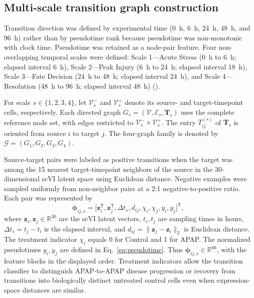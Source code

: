 \subsection*{Multi-scale transition graph construction}

Transition direction was defined by experimental time (0~h, 6~h, 24~h, 48~h, and 96~h) rather than by pseudotime rank because pseudotime was non-monotonic with clock time. Pseudotime was retained as a node-pair feature. Four non-overlapping temporal scales were defined: Scale 1---Acute Stress (0~h to 6~h; elapsed interval 6~h), Scale 2---Peak Injury (6~h to 24~h; elapsed interval 18~h), Scale 3---Fate Decision (24~h to 48~h; elapsed interval 24~h), and Scale 4---Resolution (48~h to 96~h; elapsed interval 48~h) ().

For scale \(s\in\{1,2,3,4\}\), let \(\mathcal V_s^-\) and \(\mathcal V_s^+\) denote its source- and target-timepoint cells, respectively. Each directed graph \(G_s=(\mathcal V,\mathcal E_s,\mathbf T_s)\) uses the complete reference node set, with edges restricted to \(\mathcal V_s^-\times\mathcal V_s^+\). The entry \(T_{ij}^{(s)}\) of \(\mathbf T_s\) is oriented from source \(i\) to target \(j\). The four-graph family is denoted by \(\mathcal G=(G_1,G_2,G_3,G_4)\).

Source-target pairs were labeled as positive transitions when the target was among the 15 nearest target-timepoint neighbors of the source in the 30-dimensional scVI latent space using Euclidean distance. Negative examples were sampled uniformly from non-neighbor pairs at a 2:1 negative-to-positive ratio. Each pair was represented by
\begin{equation}\label{eq:pair-features}
\boldsymbol\phi_{ij,s}=
\big[\boldsymbol z_i^{\mathsf T},\boldsymbol z_j^{\mathsf T},
\Delta t_s,d_{ij},\chi_i,\chi_j,y_i,y_j\big]^{\mathsf T},
\end{equation}
where \(\boldsymbol z_i,\boldsymbol z_j\in\mathbb R^{30}\) are the scVI latent vectors, \(t_i,t_j\) are sampling times in hours, \(\Delta t_s=t_j-t_i\) is the elapsed interval, and \(d_{ij}=\|\boldsymbol z_j-\boldsymbol z_i\|_2\) is Euclidean distance. The treatment indicator \(\chi_i\) equals 0 for Control and 1 for APAP. The normalized pseudotimes \(y_i,y_j\) are defined in Eq.~\eqref{eq:pseudotime}. Thus \(\boldsymbol\phi_{ij,s}\in\mathbb R^{66}\), with the feature blocks in the displayed order. Treatment indicators allow the transition classifier to distinguish APAP-to-APAP disease progression or recovery from transitions into biologically distinct untreated control cells even when expression-space distances are similar.

